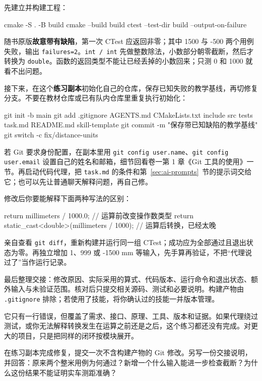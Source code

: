 \begin{example}[走完一次修复与交付]
先建立并构建工程：
\begin{tbash}
cmake -S . -B build
cmake --build build
ctest --test-dir build --output-on-failure
\end{tbash}
随书原版\textbf{故意带有缺陷}，第一次 CTest 应返回非零；其中 1500 与 -500 两个用例失败，输出 \texttt{failures=2}。\texttt{int / int} 先做整数除法，小数部分朝零截断，然后才转换为 \texttt{double}。函数的返回类型不能让已经丢掉的小数回来；只测 0 和 1000 就看不出问题。

接下来，在这个\textbf{练习副本}初始化自己的仓库，保存已知失败的教学基线，再切修复分支。不要在教材仓库或已有队内仓库里重复执行初始化：
\begin{tbash}
git init -b main
git add .gitignore AGENTS.md CMakeLists.txt include src tests task.md README.md skill-template
git commit -m "保存带已知缺陷的教学基线"
git switch -c fix/distance-units
\end{tbash}
若 Git 要求身份配置，在副本里用 \texttt{git config user.name}、\texttt{git config user.email} 设置自己的姓名和邮箱，细节回看卷一第 1 章《Git 工具的使用》一节。再启动代码代理，把 \texttt{task.md} 的条件和第~\ref{sec:ai-prompts}~节的提示词交给它；也可以先让普通聊天解释问题，再自己修。

修改后你要能解释下面两种写法的区别：
\begin{tcpp}
return millimeters / 1000.0;  // 运算前改变操作数类型
return static_cast<double>(millimeters / 1000);  // 运算后转换，已经太晚
\end{tcpp}
亲自查看 \texttt{git diff}，重新构建并运行同一组 CTest；成功应为全部通过且退出状态为零。再独立增加 1、999 或 -1500 mm 等输入，先手算再验证，不把“代理说过了”当作运行记录。

最后整理交接：修改原因、实际采用的算式、代码版本、运行命令和退出状态、额外输入与未验证范围。核对后只提交相关源码、测试和必要说明。构建产物由 \texttt{.gitignore} 排除；若使用了技能，将你确认过的技能一并版本管理。
\end{example}

它只有一行错误，但覆盖了需求、接口、原理、工具、版本和证据。如果代理绕过测试，或你无法解释转换发生在运算之前还是之后，这个练习都还没有完成。对更大的项目，只是把同样的闭环按模块展开。

\begin{exercise}\label{ex:ai-lab}
在练习副本完成修复，提交一次不含构建产物的 Git 修改。另写一份交接说明，并回答：原来两个整米用例为何通过？新增一个什么输入能进一步检查截断？为什么这份结果不能证明实车测距准确？
\end{exercise}
